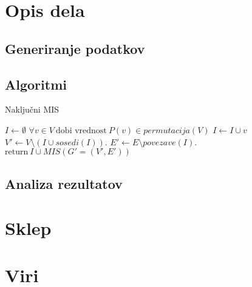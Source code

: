 \documentclass[a4paper, 12pt]{article}
\begin{document}
\newpage

\section{Opis dela}

\subsection{Generiranje podatkov}

\subsection{Algoritmi}

\begin{algorithm}
\caption{Naključni MIS}\label{euclid}
\begin{algorithmic}[1]
\State $\textit{I} \gets \emptyset$
\State $\forall v \in V\ \text{dobi vrednost}\ \textit{P}(v) \in \textit{permutacija}(V)$
\State $ I \gets I \cup v $
\EndIf
\State $V' \gets V \setminus (I \cup \textit{sosedi}(I))$.
\State $E' \gets E \setminus \textit{povezave}(I)$.
\State $\text{return}\  I \cup \textit{MIS}(G'=(V', E'))$
\end{algorithmic}
\end{algorithm}

\subsection{Analiza rezultatov}

\section{Sklep}

\section{Viri}
\end{document}
